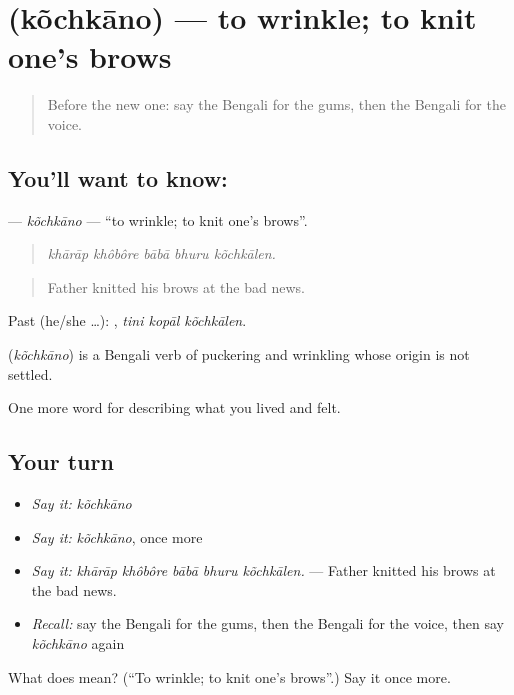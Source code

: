 \section[\texorpdfstring{\bn{কোঁচকানো} (kõchkāno)}{কোঁচকানো (kõchkāno)}]{ (kõchkāno) — to wrinkle; to knit one's brows}

\label{lesson:BN-C467-kochkano}



\begin{quote}
Before the new one: say the Bengali for the gums, then the Bengali for the voice.
\end{quote}

\subsection*{You'll want to know: }
\textbf{} — \emph{kõchkāno} — \textquotedblleft{}to wrinkle; to knit one's brows\textquotedblright{}.

\begin{quote}
    
\end{quote}

\begin{quote}
\emph{khārāp khôbôre bābā bhuru kõchkālen.}
\end{quote}

\begin{quote}
Father knitted his brows at the bad news.
\end{quote}

Past (he/she …):   , \emph{tini kopāl kõchkālen}.

\begin{cousinweb}
\textbf{} (\emph{kõchkāno}) is a Bengali verb of puckering and wrinkling whose origin is not settled.
\end{cousinweb}

\begin{grammarlens}[title={What you've built}]
One more word for describing what you lived and felt.
\end{grammarlens}

\subsection*{Your turn}
\begin{itemize}
\raggedright
  \item \emph{Say it:} \emph{kõchkāno}
  \item \emph{Say it:} \emph{kõchkāno}, once more
  \item \emph{Say it:} \emph{khārāp khôbôre bābā bhuru kõchkālen.} — Father knitted his brows at the bad news.
  \item \emph{Recall:} say the Bengali for the gums, then the Bengali for the voice, then say \emph{kõchkāno} again
\end{itemize}

\begin{tcolorbox}[breakable,colback=teal!4,colframe=teal!35!black,title={Before you move on}]
What does  mean? (\textquotedblleft{}To wrinkle; to knit one's brows\textquotedblright{}.) Say it once more.
\end{tcolorbox}
